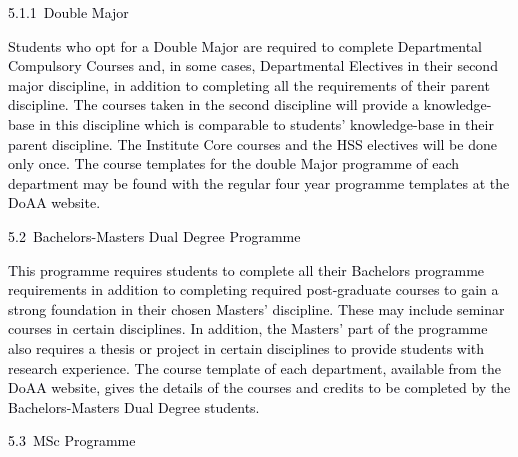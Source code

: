 \documentclass[12pt]{article}
\begin{document}
\vspace{\baselineskip}
{\fontsize{10pt}{12.0pt}\selectfont \textcolor[HTML]{00000A}{5.1.1\  Double Major}\par}\par


\vspace{\baselineskip}
\begin{justify}
{\fontsize{10pt}{12.0pt}\selectfont \textcolor[HTML]{00000A}{Students who opt for a Double Major are required to complete Departmental Compulsory Courses and, in some cases, Departmental Electives in their second major discipline, in addition to completing all the requirements of their parent discipline. The courses taken in the second discipline will provide a knowledge-base in this discipline which is comparable to students’ knowledge-base in their parent discipline. The Institute Core courses and the HSS electives will be done only once. The course templates for the double Major programme of each department may be found with the regular four year programme templates at the DoAA website.}\par}
\end{justify}\par


\vspace{\baselineskip}
\textcolor[HTML]{00000A}{5.2\  Bachelors-Masters Dual Degree Programme}\par


\vspace{\baselineskip}
\begin{justify}
{\fontsize{9pt}{10.8pt}\selectfont \textcolor[HTML]{00000A}{This programme requires students to complete all their Bachelors programme requirements in addition to completing required post-graduate courses to gain a strong foundation in their chosen Masters’ discipline. These may include seminar courses in certain disciplines. In addition, the Masters’ part of the programme also requires a thesis or project in certain disciplines to provide students with research experience. The course template of each department, available from the DoAA website, gives the details of the courses and credits to be completed by the Bachelors-Masters Dual Degree students.}\par}
\end{justify}\par


\vspace{\baselineskip}
\textcolor[HTML]{00000A}{5.3\  MSc Programme}\par
\end{document}
